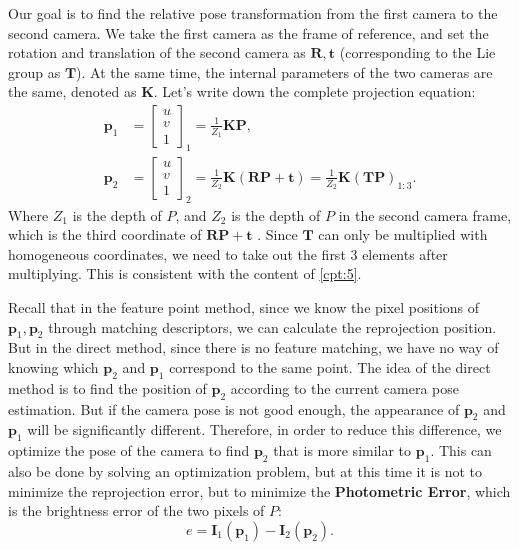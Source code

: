 {Our goal is to find the relative pose transformation from the first camera to the second camera. We take the first camera as the frame of reference, and set the rotation and translation of the second camera as $\bm{R}, \bm{t}$ (corresponding to the Lie group as $\bm{T}$). At the same time, the internal parameters of the two cameras are the same, denoted as $\bm{K}$. Let's write down the complete projection equation:
\begin{align*}
{\bm{p}_1} &= {\left[ \begin{array}{l}
	u\\
	v\\
	1
	\end{array} \right]_1} = \frac{1}{Z_1} \bm{KP}, \\
{\bm{p}_2} &= {\left[ \begin{array}{l}
	u\\
	v\\
	1
	\end{array} \right]_2} = \frac{1}{Z_2} \bm{K}\left( {\bm{RP} +\bm{t}} \right) = \frac{1}{Z_2} \bm{K} \left(\bm{T}  \bm{P} \right)_{1:3}.
\end{align*}
Where $Z_1$ is the depth of $P$, and $Z_2$ is the depth of $P$ in the second camera frame, which is the third coordinate of $\bm{RP}+\bm{t}$ . Since $\bm{T}$ can only be multiplied with homogeneous coordinates, we need to take out the first 3 elements after multiplying. This is consistent with the content of \ref{cpt:5}.

Recall that in the feature point method, since we know the pixel positions of $\bm{p}_1, \bm{p}_2$ through matching descriptors, we can calculate the reprojection position. But in the direct method, since there is no feature matching, we have no way of knowing which $\bm{p}_2$ and $\bm{p}_1$ correspond to the same point. The idea of the direct method is to find the position of $\bm{p}_2$ according to the current camera pose estimation. But if the camera pose is not good enough, the appearance of $\bm{p}_2$ and $\bm{p}_1$ will be significantly different. Therefore, in order to reduce this difference, we optimize the pose of the camera to find $\bm{p}_2$ that is more similar to $\bm{p}_1$. This can also be done by solving an optimization problem, but at this time it is not to minimize the reprojection error, but to minimize the \textbf{Photometric Error}, which is the brightness error of the two pixels of $P$:
\begin{equation}
e = {\bm{I}_1}\left( {{\bm{p}_1}} \right) - {\bm{I}_2}\left( {{\bm{p}_2}} \right).
\end{equation}

}
